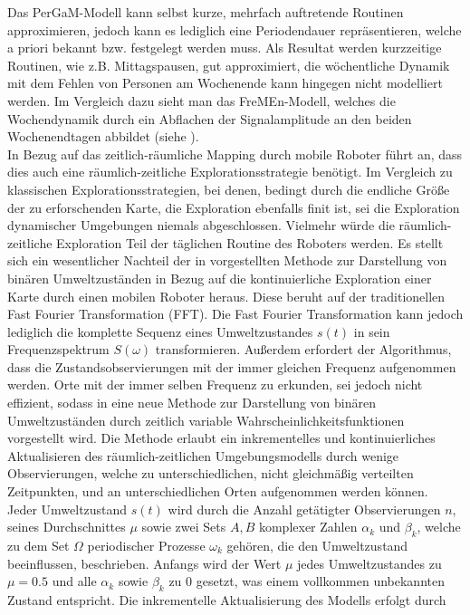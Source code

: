 Das PerGaM-Modell kann selbst kurze, mehrfach auftretende Routinen approximieren, jedoch kann es lediglich eine Periodendauer repräsentieren, welche a priori bekannt bzw. festgelegt werden muss. Als Resultat werden kurzzeitige Routinen, wie z.B. Mittagspausen, gut approximiert, die wöchentliche Dynamik mit dem Fehlen von Personen am Wochenende kann hingegen nicht modelliert werden. Im Vergleich dazu sieht man das FreMEn-Modell, welches die Wochendynamik durch ein Abflachen der Signalamplitude an den beiden Wochenendtagen abbildet (siehe ). \\
In Bezug auf das zeitlich-räumliche Mapping durch mobile Roboter führt \cite{Krajnik.2015} an, dass dies auch eine räumlich-zeitliche Explorationsstrategie benötigt. Im Vergleich zu klassischen Explorationsstrategien, bei denen, bedingt durch die endliche Größe der zu erforschenden Karte, die Exploration ebenfalls finit ist, sei die Exploration dynamischer Umgebungen niemals abgeschlossen. Vielmehr würde die räumlich-zeitliche Exploration Teil der täglichen Routine des Roboters werden.
Es stellt sich ein wesentlicher Nachteil der in \cite{Krajnik.2014} vorgestellten Methode zur Darstellung von binären Umweltzuständen in Bezug auf die kontinuierliche Exploration einer Karte durch einen mobilen Roboter heraus. Diese beruht auf der traditionellen Fast Fourier Transformation (FFT). Die Fast Fourier Transformation kann jedoch lediglich die komplette Sequenz eines Umweltzustandes $s(t)$ in sein Frequenzspektrum $S(\omega)$ transformieren. Außerdem erfordert der Algorithmus, dass die Zustandsobservierungen mit der immer gleichen Frequenz aufgenommen werden.  Orte mit der immer selben Frequenz zu erkunden, sei jedoch nicht effizient, sodass in \cite{Krajnik.2015} eine neue Methode zur Darstellung von binären Umweltzuständen durch zeitlich variable Wahrscheinlichkeitsfunktionen vorgestellt wird. Die Methode erlaubt ein inkrementelles und kontinuierliches Aktualisieren des räumlich-zeitlichen Umgebungsmodells durch wenige Observierungen, welche zu unterschiedlichen, nicht gleichmäßig verteilten Zeitpunkten, und an unterschiedlichen Orten aufgenommen werden können. \\
Jeder Umweltzustand $s(t)$ wird durch die Anzahl getätigter Observierungen $n$, seines Durchschnittes $\mu$ sowie zwei Sets $A,B$ komplexer Zahlen $\alpha_k$ und $\beta_k$, welche zu dem Set $\Omega$ periodischer Prozesse $\omega_k$ gehören, die den Umweltzustand beeinflussen, beschrieben. Anfangs wird der Wert $\mu$ jedes Umweltzustandes zu $\mu = 0.5$ und alle $\alpha_k$ sowie $\beta_k$ zu 0 gesetzt, was einem vollkommen unbekannten Zustand entspricht. Die inkrementelle Aktualisierung des Modells erfolgt durch 
